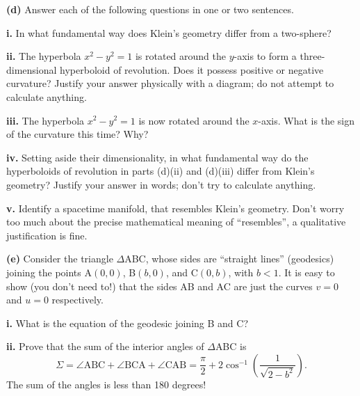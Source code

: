 \documentclass[a4paper]{article} %
\begin{document}
\begin{framed}
\textbf{(d)} Answer each of the following questions in one or two sentences.
\end{framed}

\begin{framed}
\textbf{i.} In what fundamental way does Klein’s geometry differ from a two-sphere?
\end{framed}

\begin{framed}
\textbf{ii.} The hyperbola $x^2-y^2=1$ is rotated around the $y$-axis to form a three-dimensional hyperboloid of revolution. Does it possess positive or negative curvature? Justify your answer physically with a diagram; do not attempt to calculate anything.
\end{framed}

\begin{framed}
\textbf{iii.} The hyperbola $x^2-y^2=1$ is now rotated around the $x$-axis. What is the sign of the curvature this time? Why?
\end{framed}

\begin{framed}
\textbf{iv.} Setting aside their dimensionality, in what fundamental way do the hyperboloids of revolution in parts (d)(ii) and (d)(iii) differ from Klein's geometry? Justify your answer in words; don’t try to calculate anything.
\end{framed}

\begin{framed}
\textbf{v.} Identify a spacetime manifold, that resembles Klein's geometry. Don’t worry too much about the precise mathematical meaning of ``resembles'', a qualitative justification is fine.
\end{framed}

\begin{framed}
\textbf{(e)} Consider the triangle $\Delta$ABC, whose sides are ``straight lines'' (geodesics) joining the points A$(0,0)$, B$(b,0)$, and C$(0,b)$, with $b<1$. It is easy to show (you don't need to!) that the sides AB and AC are just the curves $v=0$ and $u=0$ respectively.
\end{framed}

\begin{framed}
\textbf{i.} What is the equation of the geodesic joining B and C?
\end{framed}

\begin{framed}
\textbf{ii.} Prove that the sum of the interior angles of $\Delta$ABC is
\begin{equation}
\Sigma = \angle\text{ABC}+\angle\text{BCA}+\angle\text{CAB}=\frac{\pi}{2}+2\cos^{-1}\left(\frac{1}{\sqrt{2-b^2}}\right).
\end{equation}
The sum of the angles is less than 180 degrees!
\end{framed}
\end{document}
